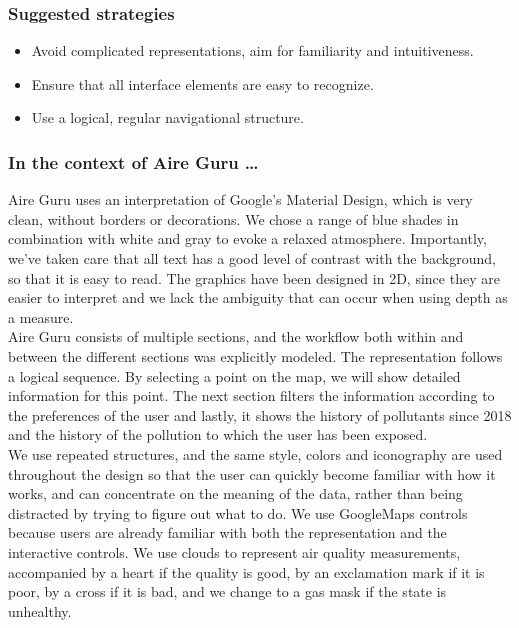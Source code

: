 \subsubsection*{Suggested strategies} 

\begin{itemize}
    \item Avoid complicated representations, aim for familiarity and intuitiveness.

    \item Ensure that all interface elements are easy to recognize.
    
    \item Use a logical, regular navigational structure.
\end{itemize}

\subsubsection*{In the context of Aire Guru \ldots}

Aire Guru uses an interpretation of Google's Material Design, which is very clean, without borders or decorations.
We chose a range of blue shades in combination with white and gray to evoke a relaxed atmosphere.
Importantly, we've taken care that all text has a good level of contrast with the background, so that it is easy to read.
The graphics have been designed in 2D, since they are easier to interpret and we lack the ambiguity that can occur when using depth as a measure.\\

Aire Guru consists of multiple sections, and the workflow both within and between the different sections was explicitly modeled.
The representation follows a logical sequence.
By selecting a point on the map, we will show detailed information for this point.
The next section filters the information according to the preferences of the user and lastly, it shows the history of pollutants since 2018 and the history of the pollution to which the user has been exposed.\\

We use repeated structures, and the same style, colors and iconography are used throughout the design so that the user can quickly become familiar with how it works, and can
concentrate on the meaning of the data, rather than being distracted by trying to figure out what to do.
We use GoogleMaps controls because users are already familiar with both the representation and the interactive controls.
We use clouds to represent air quality measurements, accompanied by a heart if the quality is good, by an exclamation mark if it is poor, by a cross if it is bad, and we change to a gas mask if the state is unhealthy.\\

